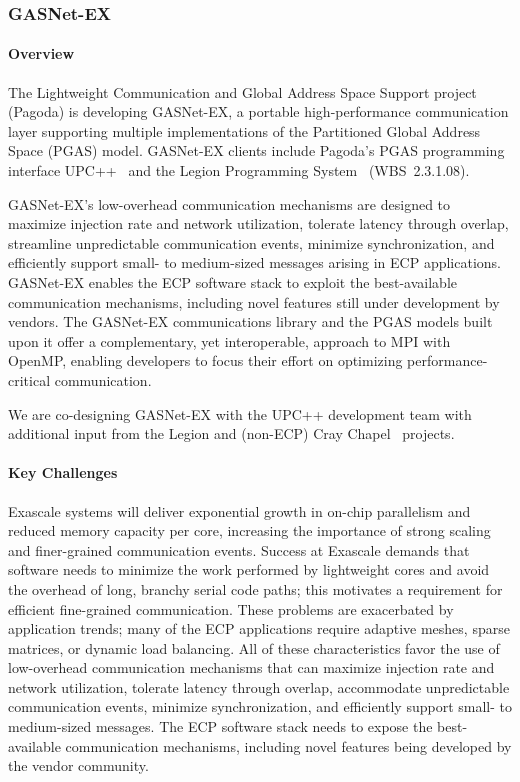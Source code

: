 \subsubsection{ GASNet-EX}
\paragraph{Overview} 

The Lightweight Communication and Global Address Space Support project (Pagoda)
is developing GASNet-EX, a portable high-performance communication layer
supporting multiple implementations of the Partitioned Global Address Space
(PGAS) model.
GASNet-EX clients include Pagoda's PGAS programming interface UPC++~\cite{Bachan:paw17,upcxx-site}
 and the Legion Programming
System~\cite{bauer2012legion,legion-site} (WBS~2.3.1.08).

GASNet-EX's low-overhead communication mechanisms are designed to maximize
injection rate and network utilization, tolerate latency through
overlap, streamline unpredictable communication events, minimize
synchronization, and efficiently support small- to medium-sized
messages arising in ECP applications.  GASNet-EX enables the ECP
software stack to exploit the best-available communication mechanisms,
including novel features still under development by vendors.  The
GASNet-EX communications library and the PGAS models built upon it
offer a complementary, yet interoperable, approach to MPI with OpenMP,
enabling developers to focus their effort on optimizing
performance-critical communication.

We are co-designing GASNet-EX with the UPC++ development team with
additional input from the Legion and
(non-ECP) Cray Chapel~\cite{chapel-chapter,chapel-site} projects.

\paragraph{Key  Challenges}

Exascale systems will deliver exponential growth in on-chip parallelism and
reduced memory capacity per core, 
increasing the importance of strong
scaling and finer-grained communication events.  
Success at Exascale demands that
software needs to minimize the work performed by lightweight cores and avoid the
overhead of long, branchy serial code paths; 
this motivates a requirement for efficient
fine-grained communication.
These problems are exacerbated by application trends; many of the ECP applications require
adaptive meshes, sparse matrices,
or dynamic load balancing.
All of these characteristics favor the use of
low-overhead communication mechanisms that
can maximize injection rate and network utilization, tolerate latency through
overlap, accommodate unpredictable communication events, minimize synchronization,
and efficiently support small- to medium-sized messages. The ECP software stack
needs to expose the best-available communication mechanisms, including novel
features being developed by the vendor community.

